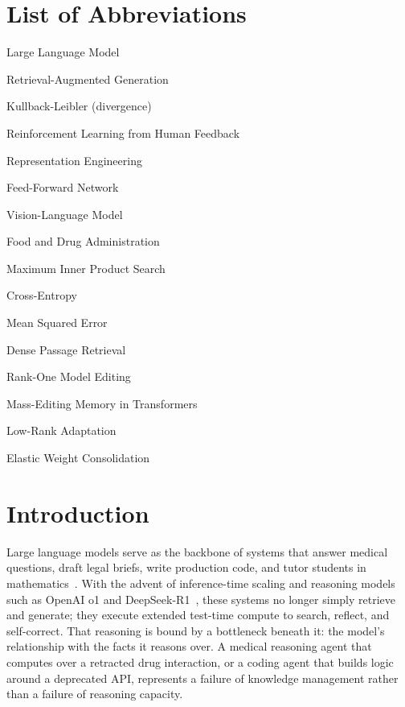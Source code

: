 \documentclass[10pt]{article}
\begin{document}
\section*{List of Abbreviations}
\begin{description}[style=multiline, leftmargin=3cm, font=\bfseries]
  \item[LLM] Large Language Model
  \item[RAG] Retrieval-Augmented Generation
  \item[KL] Kullback-Leibler (divergence)
  \item[RLHF] Reinforcement Learning from Human Feedback
  \item[RepE] Representation Engineering
  \item[FFN] Feed-Forward Network
  \item[VLM] Vision-Language Model
  \item[FDA] Food and Drug Administration
  \item[MIPS] Maximum Inner Product Search
  \item[CE] Cross-Entropy
  \item[MSE] Mean Squared Error
  \item[DPR] Dense Passage Retrieval
  \item[ROME] Rank-One Model Editing
  \item[MEMIT] Mass-Editing Memory in Transformers
  \item[LoRA] Low-Rank Adaptation
  \item[EWC] Elastic Weight Consolidation
\end{description}

\section{Introduction}
\label{sec:introduction}

Large language models serve as the backbone of systems that answer medical questions, draft legal briefs, write production code, and tutor students in mathematics~\citep{brown2020language, achiam2023gpt4, team2023gemini}. With the advent of inference-time scaling and reasoning models such as OpenAI o1 and DeepSeek-R1~\citep{openai2024o1, guo2025deepseekr1}, these systems no longer simply retrieve and generate; they execute extended test-time compute to search, reflect, and self-correct. That reasoning is bound by a bottleneck beneath it: the model's relationship with the facts it reasons over. A medical reasoning agent that computes over a retracted drug interaction, or a coding agent that builds logic around a deprecated API, represents a failure of knowledge management rather than a failure of reasoning capacity.
\end{document}
